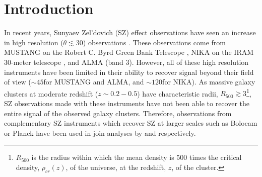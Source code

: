 \documentclass[twocolumn,traditabstract]{aa}
\begin{document}
\maketitle

\section{Introduction}
\label{sec:intro}



In recent years, Sunyaev Zel'dovich (SZ) effect observations have seen an increase in high resolution ($\theta \lesssim 30$\asecs)
observations \citep[e.g.][]{mason2010,adam2014,kitayama2016}. These observations come from MUSTANG on the
Robert C. Byrd Green Bank Telescope \citep[GBT][]{dicker2008}, NIKA on the IRAM 30-meter telescope \citep{monfardini2010},
and ALMA (band 3). However, all of these high resolution instruments have been limited in their ability to
recover signal beyond their field of view ($\sim 45$\asecs for MUSTANG and ALMA, and $\sim 120$\asecs for NIKA). As massive
galaxy clusters at moderate redshift ($z \sim 0.2-0.5$) have characteristic radii,
$R_{500} \gtrsim 3$\amin\footnote{$R_{500}$ is the radius within which the mean density is 500 times the
  critical density, $\rho_{cr}(z)$, of the universe, at the redshift, $z$, of the cluster.},
SZ observations made with these instruments have not been able to recover the
entire signal of the observed galaxy clusters. Therefore, observations from complementary SZ instruments which recover SZ at larger scales
such as Bolocam \citet{czakon2015} or Planck \citep{planck2013a} have been used in join analyses by
\citet{romero2015a} and \citet{adam2015,adam2016a} respectively.
\end{document}
